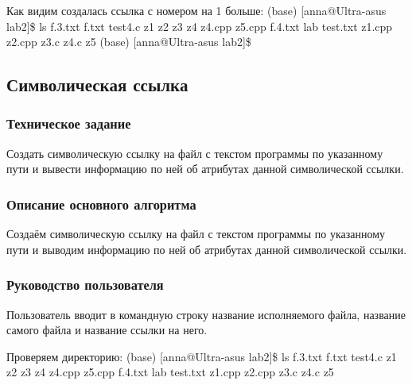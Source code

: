 \documentclass[a4paper,12pt]{extarticle}
\begin{document}
Как видим создалась ссылка с номером на 1 больше:\newline
(base) [anna@Ultra-asus lab2]\$ ls\newline
f.3.txt  f.txt  test4.c   z1      z2      z3    z4    z4.cpp  z5.cpp\newline
f.4.txt  lab    test.txt  z1.cpp  z2.cpp  z3.c  z4.c  z5\newline
(base) [anna@Ultra-asus lab2]\$ \newline


\subsection{Символическая ссылка}
\subsubsection{Техническое задание}
Создать символическую ссылку на файл с текстом программы по указанному пути и вывести информацию по ней об атрибутах данной символической ссылки.

\subsubsection{Описание основного алгоритма}
Создаём символическую ссылку на файл с текстом программы по указанному пути и выводим информацию по ней об атрибутах данной символической ссылки.

\subsubsection{Руководство пользователя}
Пользователь вводит в командную строку название исполняемого файла, название самого файла и название ссылки на него.\newline

Проверяем директорию:\newline
(base) [anna@Ultra-asus lab2]\$ ls\newline
f.3.txt  f.txt  test4.c   z1      z2      z3    z4    z4.cpp  z5.cpp\newline
f.4.txt  lab    test.txt  z1.cpp  z2.cpp  z3.c  z4.c  z5\newline
\end{document}
